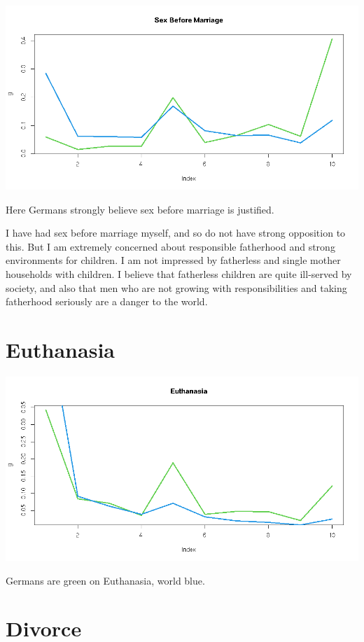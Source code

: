 \documentclass{amsart}
\begin{document}
\includegraphics[scale=0.5]{sexm.jpeg}

Here Germans strongly believe sex before marriage is justified.

I have had sex before marriage myself, and so do not have strong opposition to this.  But I am extremely concerned about responsible fatherhood and strong environments for children.  I am not impressed by fatherless and single mother households with children.  I believe that fatherless children are quite ill-served by society, and also that men who are not growing with responsibilities and taking fatherhood seriously are a danger to the world.

\section{Euthanasia}

\includegraphics[scale=0.5]{euth.jpeg}

Germans are green on Euthanasia, world blue.

\section{Divorce}
\end{document}
